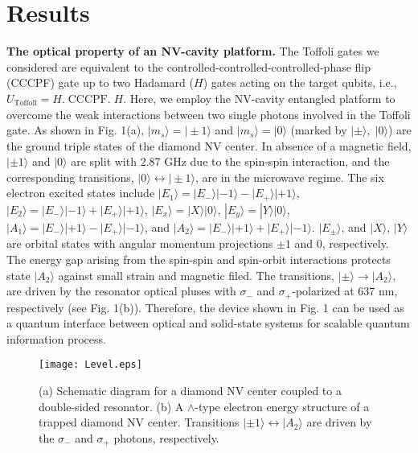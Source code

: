 \documentclass[showpacs,preprintnumbers,showkeys,amsmath,amssymb]{revtex4}%
\begin{document}
\section{Results}\label{sec2}
{\bf The optical property of an NV-cavity platform.}
%
%
%
 The Toffoli gates we considered are equivalent to the controlled-controlled-controlled-phase flip (CCCPF) gate up to two Hadamard  ($H$) gates acting on the target qubits, i.e., $U_{\text{Toffoli}}=H.\;\text{CCCPF}.\;H$. Here, we employ the NV-cavity entangled platform to overcome the weak interactions between two single photons involved in the Toffoli gate. As shown in Fig. 1(a),  $|m_s\rangle=|\pm 1\rangle$ and $|m_s\rangle=|0\rangle$ (marked by $|\pm\rangle,\;|0\rangle$) are the ground triple states of the diamond NV center. In absence of a magnetic field, $|\pm 1\rangle $ and $|0\rangle$ are split with 2.87 GHz due to the spin-spin interaction, and the corresponding transitions, $|0\rangle\leftrightarrow|\pm1\rangle$, are in the microwave regime. The six electron excited states include\cite{excited-state}
$|E_1\rangle=|E_-\rangle|-1\rangle-|E_+\rangle|+1\rangle$,
$|E_2\rangle=|E_-\rangle|-1\rangle+|E_+\rangle|+1\rangle$,
$|E_x\rangle=|X\rangle|0\rangle$,
$|E_y\rangle=|Y\rangle|0\rangle$,
$|A_1\rangle =|E_-\rangle|+1\rangle-|E_+\rangle|-1\rangle$, and
$|A_2\rangle=|E_-\rangle|+1\rangle+|E_+\rangle|-1\rangle$. $|E_{\pm}\rangle$, and $|X\rangle$, $|Y\rangle$ are orbital states with angular momentum projections $\pm1$ and $0$, respectively.
The energy gap arising from the spin-spin and spin-orbit interactions protects state $|A_2\rangle$ against small strain and magnetic filed. The transitions, $|\pm\rangle\rightarrow|A_2\rangle$, are driven by the resonator optical pluses with $\sigma_-$ and $\sigma_+$-polarized at 637 nm, respectively (see Fig. 1(b)). Therefore, the device shown in Fig. 1 can be used as a quantum interface between optical and solid-state systems for scalable quantum information process.



\begin{figure}[!h]       %
\centering
\texttt{[image: Level.eps]}
\caption{(a) Schematic diagram for a diamond NV center coupled to a double-sided resonator. (b) A $\wedge$-type electron energy structure of a trapped diamond NV center. Transitions $|\pm1\rangle\leftrightarrow|A_2\rangle$ are driven by the $\sigma_-$ and $\sigma_+$  photons, respectively.
}
\label{Level}
\end{figure}
\end{document}
